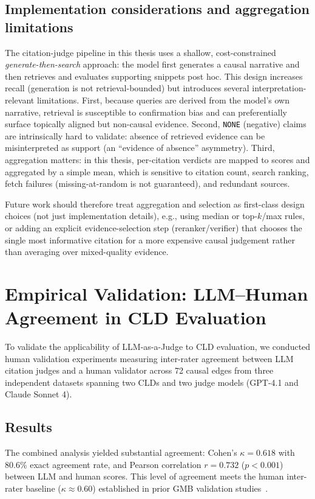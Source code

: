 \subsection{Implementation considerations and aggregation limitations}
\label{sec:discussion_citation_aggregation}

The citation-judge pipeline in this thesis uses a shallow, cost-constrained \emph{generate-then-search} approach: the model first generates a causal narrative and then retrieves and evaluates supporting snippets post hoc. This design increases recall (generation is not retrieval-bounded) but introduces several interpretation-relevant limitations. First, because queries are derived from the model's own narrative, retrieval is susceptible to confirmation bias and can preferentially surface topically aligned but non-causal evidence. Second, \texttt{NONE} (negative) claims are intrinsically hard to validate: absence of retrieved evidence can be misinterpreted as support (an ``evidence of absence'' asymmetry). Third, aggregation matters: in this thesis, per-citation verdicts are mapped to scores and aggregated by a simple mean, which is sensitive to citation count, search ranking, fetch failures (missing-at-random is not guaranteed), and redundant sources.

Future work should therefore treat aggregation and selection as first-class design choices (not just implementation details), e.g., using median or top-$k$/max rules, or adding an explicit evidence-selection step (reranker/verifier) that chooses the single most informative citation for a more expensive causal judgement rather than averaging over mixed-quality evidence.

\section{Empirical Validation: LLM--Human Agreement in CLD Evaluation}
\label{sec:discussion_judge_human_agreement}
To validate the applicability of LLM-as-a-Judge to CLD evaluation, we conducted human validation experiments measuring inter-rater agreement between LLM citation judges and a human validator across 72 causal edges from three independent datasets spanning two CLDs and two judge models (GPT-4.1 and Claude Sonnet 4).

\subsection{Results}
The combined analysis yielded substantial agreement: Cohen's $\kappa = 0.618$ with 80.6\% exact agreement rate, and Pearson correlation $r = 0.732$ ($p < 0.001$) between LLM and human scores. This level of agreement meets the human inter-rater baseline ($\kappa \approx 0.60$) established in prior GMB validation studies~\citep{landis1977measurement}.

